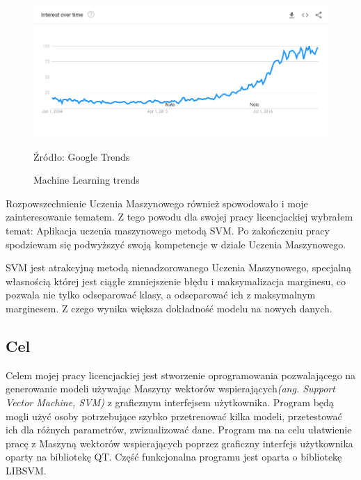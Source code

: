 \documentclass[paper=a4, fontsize=11pt]{scrartcl} %
\numberwithin{equation}{section} %
\numberwithin{figure}{section} %
\newcommand*{\captionsource}[2]{%
  \caption[{#1}]{%
      #1}
    Źródło: #2%
}
\begin{document}
    \begin{figure}[H]
        \begin{center}
            \includegraphics[scale=0.5]{./img/google-trends-ml.png}
            \captionsource{Machine Learning trends}{Google Trends}
            \label{fig:google-trends-ml}
        \end{center}
    \end{figure}

    \par Rozpowszechnienie Uczenia Maszynowego również spowodowało i moje zainteresowanie
    tematem.  Z tego powodu dla swojej pracy licencjackiej wybrałem temat: Aplikacja uczenia
    maszynowego metodą SVM. Po zakończeniu pracy spodziewam się podwyższyć swoją kompetencje w
    dziale Uczenia Maszynowego.
    \par SVM jest atrakcyjną metodą nienadzorowanego Uczenia Maszynowego, specjalną własnością
    której jest ciągłe zmniejszenie błędu i maksymalizacja marginesu, co pozwala nie tylko
    odseparować klasy, a odseparować ich z maksymalnym marginesem. Z czego wynika większa
    dokładność modelu na nowych danych.

\subsection{Cel}
    \par Celem mojej pracy licencjackiej jest stworzenie oprogramowania pozwalającego na
    generowanie modeli używając Maszyny wektorów wspierających\textit{(ang. Support Vector
    Machine, SVM)} z graficznym interfejsem użytkownika.  Program będą mogli użyć osoby
    potrzebujące szybko przetrenować kilka modeli, przetestować ich dla różnych parametrów,
    zwizualizować dane. Program ma na celu ułatwienie pracę z Maszyną wektorów wspierających
    poprzez graficzny interfejs użytkownika oparty na bibliotekę QT. Część funkcjonalna
    programu jest oparta o bibliotekę LIBSVM\cite{CC01a}.
\end{document}
